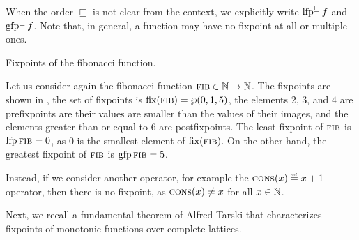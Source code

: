 When the order $\sqsubseteq$ is not clear from the context, we explicitly write $\operatorname{lfp}^{\sqsubseteq} f$ and $\operatorname{gfp}^{\sqsubseteq} f$. Note that, in general, a function may have no fixpoint at all or multiple ones.

\begin{marginfigure}
\caption{Fixpoints of the fibonacci function.}
\end{marginfigure}

\begin{example}
  Let us consider again the fibonacci function $\textsc{fib} \in \mathbb{N} \to \mathbb{N}$. The fixpoints are shown in , the set of fixpoints is $\textup{fix}(\textsc{fib}) = \wp(0, 1, 5)$, the elements $2$, $3$, and $4$ are prefixpoints are their values are smaller than the values of their images, and the elements greater than or equal to $6$ are postfixpoints.
  The least fixpoint of $\textsc{fib}$ is $\operatorname{lfp} \textsc{fib} = 0$, as $0$ is the smallest element of $\textup{fix}(\textsc{fib})$.
  On the other hand, the greatest fixpoint of $\textsc{fib}$ is $\operatorname{gfp} \textsc{fib} = 5$.

  Instead, if we consider another operator, for example the $\textsc{cons}(x) \defeq x + 1$ operator, then there is no fixpoint, as $\textsc{cons}(x) \neq x$ for all $x \in \mathbb{N}$.
\end{example}

Next, we recall a fundamental theorem of Alfred Tarski  that characterizes fixpoints of monotonic functions over complete lattices.

